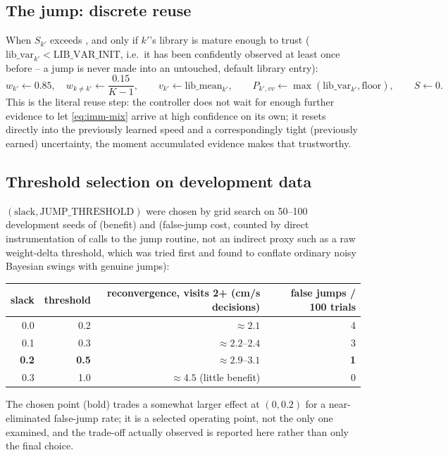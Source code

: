 \documentclass[11pt,a4paper]{article}
\newcommand{\code}[1]{\texttt{\detokenize{#1}}}
\begin{document}
\subsection{The jump: discrete reuse}
\label{sec:jump}
When $S_{k'}$ exceeds \code{JUMP_THRESHOLD}, and only if $k'$'s library is mature
enough to trust ($\text{lib\_var}_{k'}<\text{LIB\_VAR\_INIT}$, i.e.\ it has been
confidently observed at least once before -- a jump is never made into an untouched,
default library entry):
\begin{equation}\label{eq:jump}
w_{k'}\leftarrow 0.85,\quad w_{k\ne k'}\leftarrow\frac{0.15}{K-1},\qquad
v_{k'}\leftarrow\text{lib\_mean}_{k'},\qquad
P_{k',vv}\leftarrow\max(\text{lib\_var}_{k'},\text{floor}),\qquad S\leftarrow0.
\end{equation}
This is the literal reuse step: the controller does not wait for enough further
evidence to let \eqref{eq:imm-mix} arrive at high confidence on its own; it resets
directly into the previously learned speed and a correspondingly tight (previously
earned) uncertainty, the moment accumulated evidence makes that trustworthy.

\subsection{Threshold selection on development data}
\label{sec:threshold-selection}
$(\text{slack},\text{JUMP\_THRESHOLD})$ were chosen by grid search on 50--100
development seeds of \code{repeated} (benefit) and \code{normal} (false-jump cost,
counted by direct instrumentation of calls to the jump routine, not an indirect proxy
such as a raw weight-delta threshold, which was tried first and found to conflate
ordinary noisy Bayesian swings with genuine jumps):
\begin{center}\small
\begin{tabular}{rrrr}\toprule
slack & threshold & reconvergence, visits 2+ (cm/s decisions) & false jumps / 100 \code{normal} trials\\\midrule
0.0 & 0.2 & $\approx2.1$ & 4\\
0.1 & 0.3 & $\approx2.2$--$2.4$ & 3\\
\textbf{0.2} & \textbf{0.5} & $\approx\mathbf{2.9}$--$\mathbf{3.1}$ & \textbf{1}\\
0.3 & 1.0 & $\approx4.5$ (little benefit) & 0\\
\bottomrule
\end{tabular}\end{center}
The chosen point (bold) trades a somewhat larger effect at $(0,0.2)$ for a
near-eliminated false-jump rate; it is a selected operating point, not the only one
examined, and the trade-off actually observed is reported here rather than only the
final choice.
\end{document}
